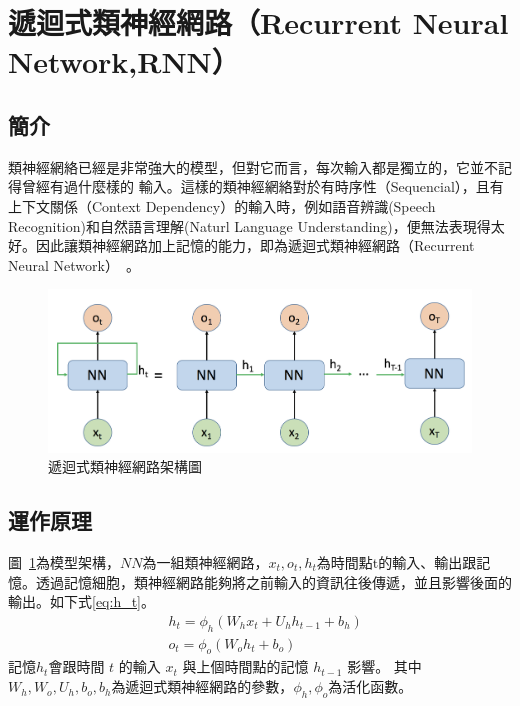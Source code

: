 \begin{itemize}
\end{itemize}
\section{遞迴式類神經網路（Recurrent Neural Network,RNN）}
\subsection{簡介}
類神經網絡已經是非常強大的模型，但對它而言，每次輸入都是獨立的，它並不記得曾經有過什麼樣的
輸入。這樣的類神經網絡對於有時序性（Sequencial），且有上下文關係（Context
Dependency）的輸入時，例如語音辨識(Speech Recognition)和自然語言理解(Naturl
Language Understanding)，便無法表現得太好。因此讓類神經網路加上記憶的能力，即為遞迴式類神經網路（Recurrent
Neural Network）~\cite{elman1990finding}。

\begin{figure}[h]
\centering
\includegraphics[scale=0.5]{images/ch2_RNN.png}
\caption{遞迴式類神經網路架構圖} \label{fig:ch2_RNN}
\end{figure}
\subsection{運作原理}
	圖~\ref{fig:ch2_RNN}為模型架構，$NN$為一組類神經網路，$x_t,o_t,h_t$為時間點t的輸入、輸出跟記憶。透過記憶細胞，類神經網路能夠將之前輸入的資訊往後傳遞，並且影響後面的輸出。如下式\ref{eq:h_t}。
\begin{equation}
\label{eq:h_t}
\begin{aligned}
&h_t = \phi_h{(W_h x_t+U_h h_{t-1}+b_h)}
\\
&o_t = \phi_o{(W_o h_t+b_o)}
\end{aligned}
\end{equation}
記憶$h_t$會跟時間 $t$ 的輸入 $x_t$ 與上個時間點的記憶 $h_{t-1}$ 影響。
其中$W_h,W_o,U_h,b_o,b_h$為遞迴式類神經網路的參數，$\phi_h,\phi_o$為活化函數。



